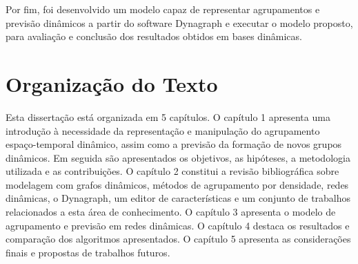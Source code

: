 \iffalse
...Os métodos estatísticos multivariados podem ser utilizados com propósitos descritivos, exploratórios ou analíticos. 

Para a obtenção das informações espaço-temporais mapeáveis e características do indivíduo, segue-se três estratégias para resolução do problema: na primeira os dados são analisados como um só grupo (Agrupamento Estático); na segunda os dados são tratados por intervalos pré-definidos; na terceira mapeia-se as evoluções entre intervalos observados.
Dessa forma, tal pesquisa visa indicar os possíveis grupos relacionado espacialmente e também no tempo.
\fi

Por fim, foi desenvolvido um modelo capaz de representar agrupamentos e previsão dinâmicos a partir do software Dynagraph e executar o modelo proposto, para avaliação e conclusão dos resultados obtidos em bases dinâmicas.

\section{Organização do Texto}
Esta dissertação está organizada em 5 capítulos. O capítulo 1 apresenta uma
introdução à necessidade da representação e manipulação do agrupamento espaço-temporal
dinâmico, assim como a previsão da formação de novos grupos dinâmicos. Em seguida são apresentados os objetivos,
as hipóteses, a metodologia utilizada e as contribuições. O capítulo 2 constitui a revisão
bibliográfica sobre modelagem com grafos dinâmicos, métodos de agrupamento por densidade, redes dinâmicas,
o Dynagraph, um editor de características e um conjunto de trabalhos relacionados a esta área de conhecimento.
O capítulo 3 apresenta o modelo de agrupamento e previsão em redes dinâmicas. O capítulo 4 destaca
os resultados e comparação dos algoritmos apresentados. O capítulo 5 apresenta as considerações finais
e propostas de trabalhos futuros.








